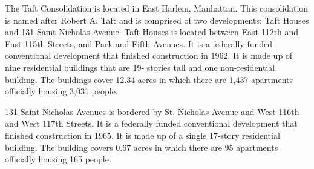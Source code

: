 The Taft Consolidation is located in East Harlem, Manhattan. This consolidation is named after Robert A. Taft and is comprised of two developments: Taft Houses and 131 Saint Nicholas Avenue. Taft Houses is located between East 112th and East 115th Streets, and Park and Fifth Avenues. It is a federally funded conventional development that finished construction in 1962. It is made up of nine residential buildings that are 19- stories tall and one non-residential building. The buildings cover 12.34 acres in which there are 1,437 apartments officially housing 3,031 people.\par \vspace{.7\baselineskip}131 Saint Nicholas Avenues is bordered by St. Nicholas Avenue and West 116th and West 117th Streets. It is a federally funded conventional development that finished construction in 1965. It is made up of  a single 17-story residential building. The building covers 0.67 acres in which there are 95 apartments officially housing 165 people.